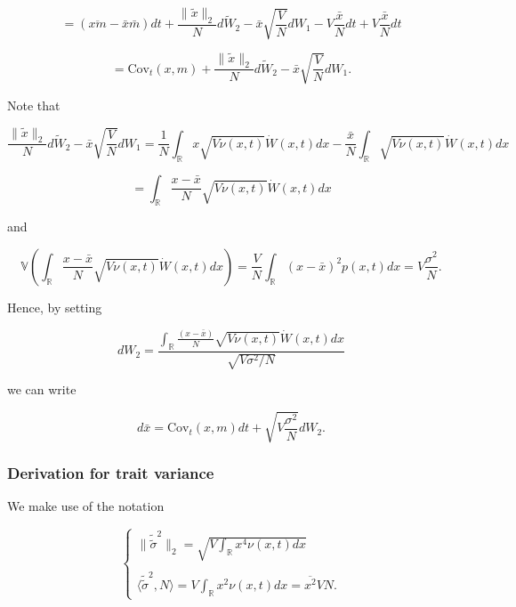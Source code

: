 \documentclass[]{article}
\begin{document}
\begin{equation*}
= (\overline{xm}-\bar x\bar m)dt+\frac{\|\tilde x\|_2}{N}d\tilde W_2
-\bar x\sqrt{\frac{V}{N}}d W_1-V\frac{\bar x}{N}dt+V\frac{\bar x}{N}dt
\end{equation*}

\begin{equation*}
=\mathrm{Cov}_t(x,m)
+\frac{\|\tilde x\|_2}{N}d\tilde W_2-\bar x\sqrt{\frac{V}{N}}d W_1.
\end{equation*}

Note that

\begin{equation}
\frac{\|\tilde x\|_2}{N}d\tilde W_2-\bar x\sqrt{\frac{V}{N}}d W_1=\frac{1}{N}\int_\mathbb{R}x\sqrt{V\nu(x,t)}\dot W(x,t)dx-\frac{\bar x}{N}\int_\mathbb{R}\sqrt{V\nu(x,t)}\dot W(x,t)dx
\end{equation}

\begin{equation*}
=\int_\mathbb{R}\frac{x-\bar x}{N}\sqrt{V\nu(x,t)}\dot W(x,t)dx
\end{equation*}

and

\begin{equation}
\mathbb{V}\left(\int_\mathbb{R}\frac{x-\bar x}{N}\sqrt{V\nu(x,t)}\dot W(x,t)dx\right)=\frac{V}{N}\int_\mathbb{R}(x-\bar x)^2p(x,t)dx=V\frac{\sigma^2}{N}.
\end{equation}

Hence, by setting

\begin{equation}
d W_2=\frac{\int_\mathbb{R}\frac{(x-\bar x)}{N}\sqrt{V\nu(x,t)}\dot W(x,t)dx}{\sqrt{V\sigma^2/N}}
\end{equation}

we can write

\begin{equation}
d\bar x=\mathrm{Cov}_t(x,m)dt
+\sqrt{V\frac{\sigma^2}{N}}d W_2.
\end{equation}

\hypertarget{derivation-for-trait-variance}{%
\subsubsection{Derivation for trait
variance}\label{derivation-for-trait-variance}}

We make use of the notation

\begin{equation}
\left\{\begin{matrix}
\|\tilde{\tilde\sigma}^2\|_2 = \sqrt{V\int_\mathbb{R}x^4\nu(x,t)dx} \\ \\
\langle\tilde{\tilde\sigma}^2,N\rangle=V\int_\mathbb{R}x^2\nu(x,t)dx=\overline{x^2}VN.
\end{matrix}\right.
\end{equation}
\end{document}
